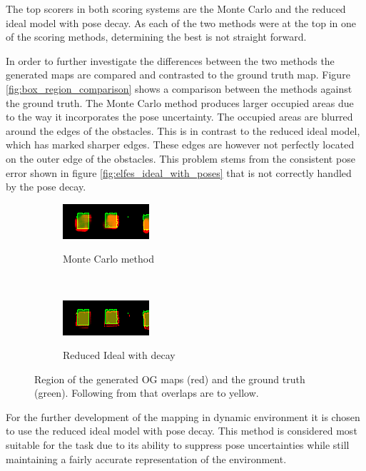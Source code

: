 The top scorers in both scoring systems are the Monte Carlo and the reduced ideal model with pose decay. As each of the two methods were at the top in one of the scoring methods, determining the best is not straight forward.

In order to further investigate the differences between the two methods the generated maps are compared and contrasted to the ground truth map. 
Figure \vref{fig:box_region_comparison} shows a comparison between the methods against the ground truth.
The Monte Carlo method produces larger occupied areas due to the way it incorporates the pose uncertainty. The occupied areas are blurred around the edges of the obstacles. 
This is in contrast to the reduced ideal model, which has marked sharper edges. 
These edges are however not perfectly located on the outer edge of the obstacles. 
This problem stems from the consistent pose error shown in figure \ref{fig:elfes_ideal_with_poses} that is not correctly handled by the pose decay. 

\begin{figure}[htbp]
	\centering
	\begin{subfigure}[t]{0.45\textwidth}
		\includegraphics[scale=1.5]{figures/static_mapping/color_diff_monte_carlo}		
		\label{fig:monte_carlo_mapsec1}
		\caption{Monte Carlo method}
	\end{subfigure}
	~ %
	\begin{subfigure}[t]{0.45\textwidth}
		\includegraphics[scale=1.5]{figures/static_mapping/color_diff_ideal_decay}
		\label{fig:ideal_deacy_mapsec1}
		\caption{Reduced Ideal with decay}
	\end{subfigure}
	\caption{Region of the generated OG maps (red) and the ground truth (green). Following from that overlaps are to yellow.}
	\label{fig:box_region_comparison}
\end{figure}

For the further development of the mapping in dynamic environment it is chosen to use the reduced ideal model with pose decay. This method is considered most suitable for the task due to its ability to suppress pose uncertainties while still maintaining a fairly accurate representation of the environment. 
